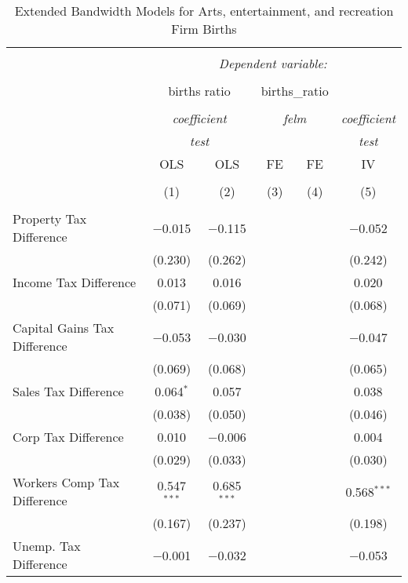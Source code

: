 
\begin{table}[!htbp] \centering 
  \caption{Extended Bandwidth Models for  Arts, entertainment, and recreation Firm Births} 
  \label{} 
\begin{tabular}{@{\extracolsep{5pt}}lccccc} 
\\[-1.8ex]\hline 
\hline \\[-1.8ex] 
 & \multicolumn{5}{c}{\textit{Dependent variable:}} \\ 
\cline{2-6} 
\\[-1.8ex] & \multicolumn{2}{c}{births ratio} & \multicolumn{2}{c}{births\_ratio} &   \\ 
\\[-1.8ex] & \multicolumn{2}{c}{\textit{coefficient}} & \multicolumn{2}{c}{\textit{felm}} & \textit{coefficient} \\ 
 & \multicolumn{2}{c}{\textit{test}} & \multicolumn{2}{c}{\textit{}} & \textit{test} \\ 
 & OLS & OLS & FE & FE & IV \\ 
\\[-1.8ex] & (1) & (2) & (3) & (4) & (5)\\ 
\hline \\[-1.8ex] 
 Property Tax Difference & $-$0.015 & $-$0.115 &  &  & $-$0.052 \\ 
  & (0.230) & (0.262) &  &  & (0.242) \\ 
  Income Tax Difference & 0.013 & 0.016 &  &  & 0.020 \\ 
  & (0.071) & (0.069) &  &  & (0.068) \\ 
  Capital Gains Tax Difference & $-$0.053 & $-$0.030 &  &  & $-$0.047 \\ 
  & (0.069) & (0.068) &  &  & (0.065) \\ 
  Sales Tax Difference & 0.064$^{*}$ & 0.057 &  &  & 0.038 \\ 
  & (0.038) & (0.050) &  &  & (0.046) \\ 
  Corp Tax Difference & 0.010 & $-$0.006 &  &  & 0.004 \\ 
  & (0.029) & (0.033) &  &  & (0.030) \\ 
  Workers Comp Tax Difference & 0.547$^{***}$ & 0.685$^{***}$ &  &  & 0.568$^{***}$ \\ 
  & (0.167) & (0.237) &  &  & (0.198) \\ 
  Unemp. Tax Difference & $-$0.001 & $-$0.032 &  &  & $-$0.053 \\ 

\end{tabular}
\end{table}
